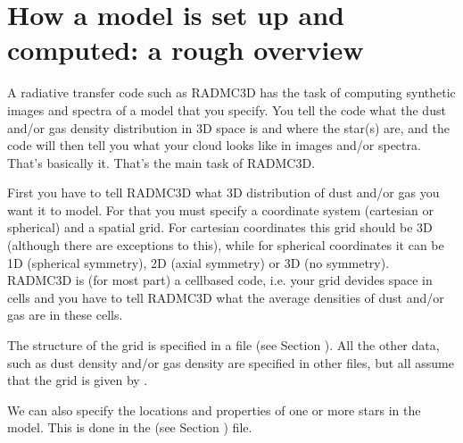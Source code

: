 \documentclass[letterpaper,10pt,english]{sphinxmanual}
\begin{document}
\section{How a model is set up and computed: a rough overview}
\label{\detokenize{basicstructure:how-a-model-is-set-up-and-computed-a-rough-overview}}
A radiative transfer code such as RADMC\sphinxhyphen{}3D has the task of computing synthetic
images and spectra of a model that you specify. You tell the code what the dust
and/or gas density distribution in 3\sphinxhyphen{}D space is and where the star(s) are, and
the code will then tell you what your cloud looks like in images and/or
spectra. That’s basically it. That’s the main task of RADMC\sphinxhyphen{}3D.

First you have to tell RADMC\sphinxhyphen{}3D what 3\sphinxhyphen{}D distribution of dust and/or gas you
want it to model. For that you must specify a coordinate system (cartesian or
spherical) and a spatial grid. For cartesian coordinates this grid should be 3\sphinxhyphen{}D
(although there are exceptions to this), while for spherical coordinates it can
be 1\sphinxhyphen{}D (spherical symmetry), 2\sphinxhyphen{}D (axial symmetry) or 3\sphinxhyphen{}D (no symmetry). RADMC\sphinxhyphen{}3D
is (for most part) a cell\sphinxhyphen{}based code, i.e. your grid devides space in cells and
you have to tell RADMC\sphinxhyphen{}3D what the average densities of dust and/or gas are in
these cells.

The structure of the grid is specified in a file  (see Section
{\hyperref[\detokenize{inputoutputfiles:sec-grid-input}]{}}). All the other data, such as dust density and/or gas
density are specified in other files, but all assume that the grid is given by
.

We can also specify the locations and properties of one or more stars in the
model. This is done in the  (see Section {\hyperref[\detokenize{inputoutputfiles:sec-stars}]{}}) file.
\end{document}
